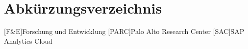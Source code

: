 \section*{Abkürzungsverzeichnis}
\begin{acronym}[AAAAAAA]
    [F\&E]{Forschung und Entwicklung}
    [PARC]{Palo Alto Research Center}
    [SAC]{SAP Analytics Cloud}
\end{acronym}
